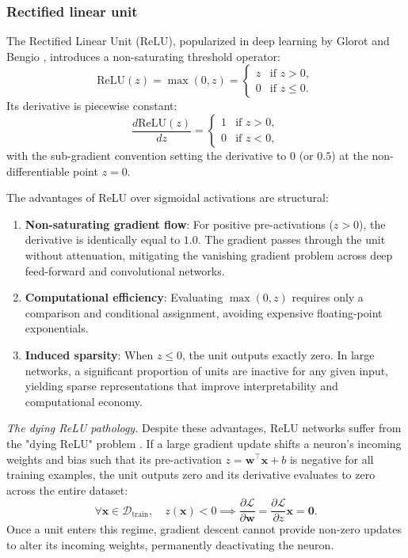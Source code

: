 \documentclass[../../../main.tex]{subfiles}
\begin{document}
\subsubsection{Rectified linear unit}

The Rectified Linear Unit ($\text{ReLU}$), popularized in deep learning by Glorot and Bengio \citep{glorot2010}, introduces a non-saturating threshold operator:
\begin{equation}
\text{ReLU}(z) = \max(0, z) = \begin{cases} 
z & \text{if } z > 0, \\ 
0 & \text{if } z \le 0. 
\end{cases}
\end{equation}
Its derivative is piecewise constant:
\begin{equation}
\frac{d\text{ReLU}(z)}{dz} = \begin{cases} 
1 & \text{if } z > 0, \\ 
0 & \text{if } z < 0, 
\end{cases}
\end{equation}
with the sub-gradient convention setting the derivative to $0$ (or $0.5$) at the non-differentiable point $z = 0$.

The advantages of ReLU over sigmoidal activations are structural:
\begin{enumerate}[label=(\roman*)]
    \item \textbf{Non-saturating gradient flow}: For positive pre-activations ($z > 0$), the derivative is identically equal to $1.0$. The gradient passes through the unit without attenuation, mitigating the vanishing gradient problem across deep feed-forward and convolutional networks.
    \item \textbf{Computational efficiency}: Evaluating $\max(0, z)$ requires only a comparison and conditional assignment, avoiding expensive floating-point exponentials.
    \item \textbf{Induced sparsity}: When $z \le 0$, the unit outputs exactly zero. In large networks, a significant proportion of units are inactive for any given input, yielding sparse representations that improve interpretability and computational economy.
\end{enumerate}

\textit{The dying ReLU pathology.} Despite these advantages, ReLU networks suffer from the "dying ReLU" problem \citep{prince2023udl}. If a large gradient update shifts a neuron's incoming weights and bias such that its pre-activation $z = \mathbf{w}^\top \mathbf{x} + b$ is negative for all training examples, the unit outputs zero and its derivative evaluates to zero across the entire dataset:
\begin{equation}
\forall \mathbf{x} \in \mathcal{D}_{\text{train}}, \quad z(\mathbf{x}) < 0 \implies \frac{\partial \mathcal{L}}{\partial \mathbf{w}} = \frac{\partial \mathcal{L}}{\partial z} \mathbf{x} = \mathbf{0}.
\end{equation}
Once a unit enters this regime, gradient descent cannot provide non-zero updates to alter its incoming weights, permanently deactivating the neuron.
\end{document}
